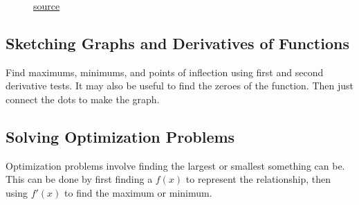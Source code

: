 \documentclass[12pt]{article}
\begin{document}
\begin{figure}[H]
	\begin{center}
		\caption{\href{https://www.khanacademy.org/math/ap-calculus-ab/ab-diff-analytical-applications-new/ab-5-6b/a/review-analyzing-the-second-derivative-to-find-inflection-points}{source}}
		\label{fig:concavityinflection}
	\end{center}
\end{figure}

\subsection{Sketching Graphs and Derivatives of Functions} %
Find maximums, minimums, and points of inflection using first and second derivative tests. It may also be useful to find the zeroes of the function. Then just connect the dots to make the graph.

\subsection{Solving Optimization Problems}
Optimization problems involve finding the largest or smallest something can be. This can be done by first finding a $f(x)$ to represent the relationship, then using $f'(x)$ to find the maximum or minimum.
\end{document}

